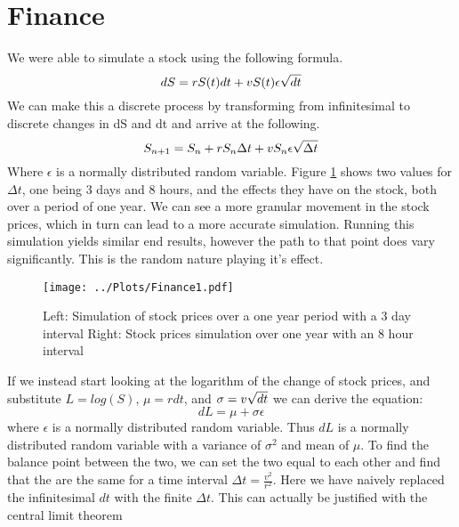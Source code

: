 \documentclass[twocolumn]{myarticle}
\begin{document}
\section{Finance}
 We were able to simulate a stock using the following formula. 
 \begin{equation}
 dS = rS(t)dt + vS(t)\epsilon \sqrtsign{dt}
 \end{equation}
 We can make this a discrete process by transforming from infinitesimal to discrete changes in dS and dt and arrive at the following.
 \begin{equation}
 S_{n+1} = S_{n} + rS_{n}\Delta t + vS_{n}\epsilon \sqrtsign{\Delta t}
 \end{equation}
 Where $\epsilon$ is a normally distributed random variable. Figure \ref{fig:Finance} shows two values for $\Delta t$, one being 3 days and 8 hours, and the effects they have on the stock, both over a period of one year. We can see a more granular movement in the stock prices, which in turn can lead to a more accurate simulation. Running this simulation yields similar end results, however the path to that point does vary significantly. This is the random nature playing it's effect. 
 
 \begin{figure}[ht!]
    \begin{center}
    \texttt{[image: ../Plots/Finance1.pdf]}
    \caption{%
        Left: Simulation of stock prices over a one year period with a 3 day interval
        Right: Stock prices simulation over one year with an 8 hour interval
            }
    \label{fig:Finance}
    \end{center}
\end{figure}
 
 If we instead start looking at the logarithm of the change of stock prices, and substitute $L=log(S)$, $\mu = rdt$, and $\sigma = v\sqrtsign{dt}$ we can derive the equation:
 \begin{equation}
 dL = \mu + \sigma\epsilon
 \end{equation}
 where $\epsilon$ is a normally distributed random variable. 
 Thus $ dL $ is a normally distributed random variable with a variance of $\sigma^2$ and mean of $\mu$. To find the balance point between the two, we can set the two equal to each other and find that the are the same for a time interval $\Delta t = \frac{v^{2}}{r^{2}}$.
Here we have naively replaced the infinitesimal $ dt $ with the finite $ \Delta t $.
This can actually be justified with the central limit theorem
\end{document}
